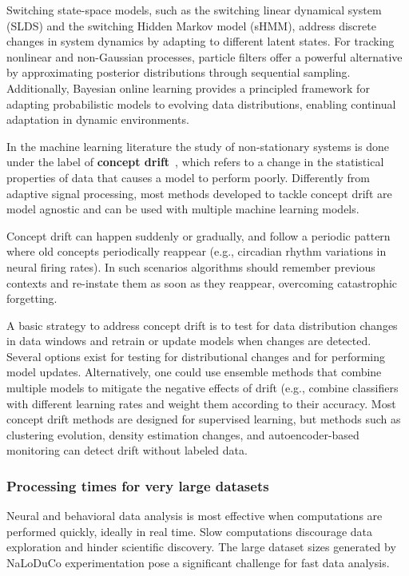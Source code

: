 \documentclass[12pt]{article}
\begin{document}
Switching state-space models, such as the switching linear dynamical system
(SLDS) and the switching Hidden Markov model (sHMM), address discrete changes
in system dynamics by adapting to different latent states. For tracking
nonlinear and non-Gaussian processes, particle filters offer a powerful
alternative by approximating posterior distributions through sequential
sampling. Additionally, Bayesian online learning provides a principled
framework for adapting probabilistic models to evolving data distributions,
enabling continual adaptation in dynamic environments.


In the machine learning literature the study of non-stationary systems is done
under the label of \textbf{concept drift}~\citep{}, which refers to a change in
the statistical properties of data that causes a model to perform poorly.
%
Differently from adaptive signal processing, most methods developed to tackle
concept drift are model agnostic and can be used with multiple machine learning
models.

Concept drift can happen suddenly or gradually, and follow a periodic pattern
where old concepts periodically reappear (e.g., circadian rhythm variations in
neural firing rates). In such scenarios algorithms should remember previous
contexts and re-instate them as soon as they reappear, overcoming catastrophic
forgetting.

A basic strategy to address concept drift is to test for data distribution
changes in data windows and retrain or update models when changes are detected.
Several options exist for testing for distributional changes and for performing
model updates.
%
Alternatively, one could use ensemble methods that combine multiple models to
mitigate the negative effects of drift (e.g., combine classifiers with
different learning rates and weight them according to their accuracy.
%
Most concept drift methods are designed for supervised learning, but methods
such as clustering evolution, density estimation changes, and autoencoder-based
monitoring can detect drift without labeled data.

\subsubsection*{Processing times for very large datasets}

Neural and behavioral data analysis is most effective when computations are
performed quickly, ideally in real time. Slow computations discourage data
exploration and hinder scientific discovery. The large dataset sizes generated by
NaLoDuCo experimentation pose a significant challenge for fast data analysis.
\end{document}
